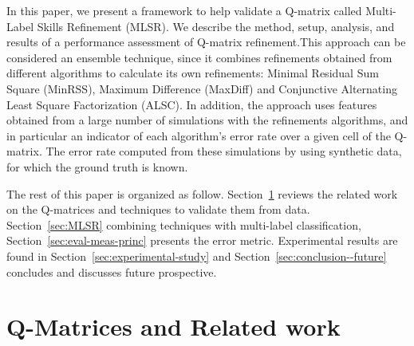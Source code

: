 \documentclass[runningheads,a4paper]{llncs}
\begin{document}
In this paper, we present a framework to help validate a Q-matrix called Multi-Label Skills Refinement (MLSR).  We describe the method, setup, analysis, and results of a performance assessment of Q-matrix refinement.This approach can be considered an ensemble technique, since it combines refinements obtained from different algorithms to calculate its own refinements: Minimal Residual Sum Square (MinRSS), Maximum Difference (MaxDiff) and Conjunctive Alternating Least Square Factorization (ALSC). In addition, the approach uses features obtained from a large number of simulations with the refinements algorithms, and in particular an indicator of each algorithm's error rate over a given cell of the Q-matrix.  The error rate computed from these simulations by using synthetic data, for which the ground truth is known.

The rest of this paper is organized as follow. Section~\ref{sec:q-matrices-related} reviews the related work on the Q-matrices and techniques to validate them from data. Section~\ref{sec:MLSR} combining techniques with multi-label classification, Section~\ref{sec:eval-meas-princ} presents the error metric. Experimental results are found in Section~\ref{sec:experimental-study} and Section~\ref{sec:conclusion--future} concludes and discusses future prospective.  

\section{ Q-Matrices and Related work}\label{sec:q-matrices-related}
\end{document}
